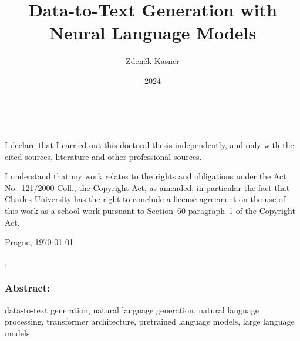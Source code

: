 \documentclass[12pt,notitlepage,a4paper,openright]{report}
\title{Data-to-Text Generation with Neural Language Models}
\author{Zdeněk Kasner}
\date{2024}
\begin{document}
%
%
%
\renewcommand{\thepage}{\roman{page}}
\renewcommand\cite{\citep}
\maketitle

\pagestyle{plain}
\normalsize
\setcounter{page}{2}

\cleardoublepage{}
\ \vspace{10mm}

\noindent \it

\vspace{\fill}
\noindent \rm
I declare that I carried out this doctoral thesis independently,
and only with the cited sources, literature and other professional sources.

I understand that my work relates to the rights and obligations
under the Act No.~121/2000 Coll., the Copyright Act, as amended,
in particular the fact that Charles University has the right
to conclude a license agreement on the use of this work as a school work
pursuant to Section~60 paragraph~1 of the Copyright Act.

\vspace{2cm}
\noindent Prague, \today \hspace{\fill}\theauthor %



\cleardoublepage{} %
\pagestyle{plain}


\begin{description}[leftmargin=7.5em,labelwidth=7em,labelindent=0em,labelsep=0.5em]
    \item[Title:] \thetitle{}
    \item[Author:] \theauthor{}
    \item[Department:] \thedept{}
    \item[Supervisor:] \thesupervisor{},\\ \thedept{}
\end{description}
\subsubsection{Abstract:}



\begin{description}[leftmargin=7.5em,labelwidth=7em,labelindent=0em,labelsep=0.5em]
    \item[Keywords:] data-to-text generation, natural language generation, natural language processing, transformer architecture, pretrained language models, large language models
\end{description}
\end{document}
